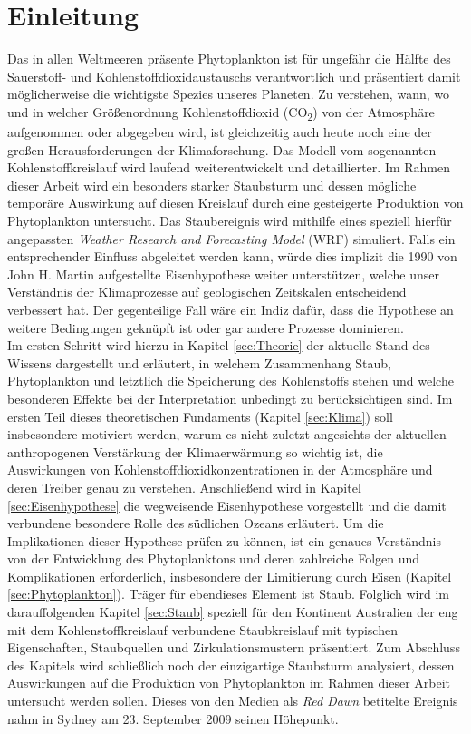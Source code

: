 \documentclass[12pt,a4paper,onecolumn]{scrartcl}
\newcommand{\cotwo}{CO\textsubscript{2}}
\begin{document}
\section{Einleitung}
Das in allen Weltmeeren präsente Phytoplankton ist für ungefähr die Hälfte des Sauerstoff- und Kohlenstoffdioxidaustauschs verantwortlich \citep{Emerson.2009} und präsentiert damit möglicherweise die wichtigste Spezies unseres Planeten. Zu verstehen, wann, wo und in welcher Größenordnung Kohlenstoffdioxid (\cotwo) von der Atmosphäre aufgenommen oder abgegeben wird, ist gleichzeitig auch heute noch eine der großen Herausforderungen der Klimaforschung. Das Modell vom sogenannten Kohlenstoffkreislauf wird laufend weiterentwickelt und detaillierter. Im Rahmen dieser Arbeit wird ein besonders starker Staubsturm und dessen mögliche temporäre Auswirkung auf diesen Kreislauf durch eine gesteigerte Produktion von Phytoplankton untersucht. Das Staubereignis wird mithilfe eines speziell hierfür angepassten \textit{Weather Research and Forecasting Model} (WRF) simuliert. Falls ein entsprechender Einfluss abgeleitet werden kann, würde dies implizit die 1990 von John H. Martin aufgestellte Eisenhypothese weiter unterstützen, welche unser Verständnis der Klimaprozesse auf geologischen Zeitskalen entscheidend verbessert hat. Der gegenteilige Fall wäre ein Indiz dafür, dass die Hypothese an weitere Bedingungen geknüpft ist oder gar andere Prozesse dominieren.  \\

Im ersten Schritt wird hierzu in Kapitel \ref{sec:Theorie} der aktuelle Stand des Wissens dargestellt und erläutert, in welchem Zusammenhang Staub, Phytoplankton und letztlich die Speicherung des Kohlenstoffs stehen und welche besonderen Effekte bei der Interpretation unbedingt zu berücksichtigen sind.  Im ersten Teil dieses theoretischen Fundaments (Kapitel  \ref{sec:Klima}) soll insbesondere motiviert werden, warum es nicht zuletzt angesichts der aktuellen anthropogenen Verstärkung der Klimaerwärmung so wichtig ist, die Auswirkungen von Kohlenstoffdioxidkonzentrationen in der Atmosphäre und deren Treiber genau zu verstehen. Anschließend wird in Kapitel \ref{sec:Eisenhypothese} die wegweisende Eisenhypothese \citep{Martin.1990} vorgestellt und die damit verbundene besondere Rolle des südlichen Ozeans erläutert. Um die Implikationen dieser Hypothese prüfen zu können, ist ein genaues Verständnis von der Entwicklung des Phytoplanktons und deren zahlreiche Folgen und Komplikationen erforderlich, insbesondere der Limitierung durch Eisen  (Kapitel \ref{sec:Phytoplankton}). Träger für ebendieses Element ist Staub. Folglich wird im darauffolgenden Kapitel \ref{sec:Staub} speziell für den Kontinent Australien der eng mit dem Kohlenstoffkreislauf verbundene Staubkreislauf mit typischen Eigenschaften, Staubquellen und Zirkulationsmustern  präsentiert. Zum Abschluss des Kapitels wird schließlich noch der einzigartige Staubsturm analysiert, dessen Auswirkungen auf die Produktion von Phytoplankton im Rahmen dieser Arbeit untersucht werden sollen. Dieses von den Medien als \textit{Red Dawn} betitelte Ereignis nahm in Sydney am 23. September 2009 seinen Höhepunkt. \\
\end{document}
